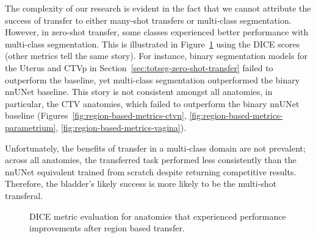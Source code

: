 \documentclass[11pt,twoside]{report}
\begin{document}
The complexity of our research is evident in the fact that we cannot attribute the success of transfer to either many-shot transfers or multi-class segmentation. However, in zero-shot transfer, some classes experienced better performance with multi-class segmentation. This is illustrated in Figure~\ref{fig:dice-region-based-vanilla} using the DICE scores (other metrics tell the same story). For instance, binary segmentation models for the Uterus and CTVp in Section~\ref{sec:totseg-zero-shot-transfer} failed to outperform the baseline, yet multi-class segmentation outperformed the binary nnUNet baseline. This story is not consistent amongst all anatomies, in particular, the CTV anatomies, which failed to outperform the binary nnUNet baseline (Figures~\ref{fig:region-based-metrics-ctvn}, \ref{fig:region-based-metrics-parametrium}, \ref{fig:region-based-metrics-vagina}).

Unfortunately, the benefits of transfer in a multi-class domain are not prevalent; across all anatomies, the transferred task performed less consistently than the nnUNet equivalent trained from scratch despite returning competitive results. Therefore, the bladder's likely success is more likely to be the multi-shot transferal.

\begin{figure}[H]
  \centering
  \caption{DICE metric evaluation for anatomies that experienced performance improvements after region based transfer.}\label{fig:dice-region-based-vanilla} 
\end{figure}
\end{document}

